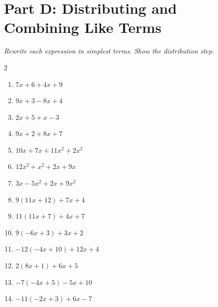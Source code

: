 \documentclass[11pt]{article}
\begin{document}
\section*{Part D: Distributing and Combining Like Terms}
\noindent\textit{Rewrite each expression in simplest terms. Show the distribution step.}
\begin{multicols}{2}
\begin{enumerate}
  \item $7x + 6 + 4x + 9$
  \vspace{1.3cm}
  \item $9x + 3 - 8x + 4$
  \vspace{1.3cm}
  \item $2x + 5 + x - 3$
  \vspace{1.3cm}
  \item $9x + 2 + 8x + 7$
  \vspace{1.3cm}
  \item $10x + 7x + 11x^{2} + 2x^{2}$
  \vspace{1.3cm}
  \item $12x^{2} + x^{2} + 2x + 9x$
  \vspace{1.3cm}
  \item $3x - 5x^{2} + 2x + 9x^{2}$
  \vspace{1.3cm}
  \item $9(11x + 12) + 7x + 4$
  \vspace{1.3cm}
  \item $11(11x + 7) + 4x + 7$
  \vspace{1.3cm}
  \item $9(-6x + 3) + 3x + 2$
  \vspace{1.3cm}
  \item $-12(-4x + 10) + 12x + 4$
  \vspace{1.3cm}
  \item $2(8x + 1) + 6x + 5$
  \vspace{1.3cm}
  \item $-7(-4x + 5) - 5x + 10$
  \vspace{1.3cm}
  \item $-11(-2x + 3) + 6x - 7$
  \vspace{1.3cm}
\end{enumerate}
\end{multicols}
\end{document}

